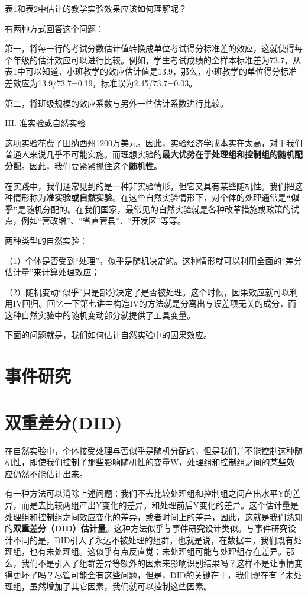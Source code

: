 \documentclass[cn,10pt,math=newtx,citestyle=gb7714-2015,bibstyle=gb7714-2015]{elegantbook}
\begin{document}
	表1和表2中估计的教学实验效果应该如何理解呢？
	
	有两种方式回答这个问题：
	
	第一，将每一行的考试分数估计值转换成单位考试得分标准差的效应，这就使得每个年级的估计效应可以进行比较。例如，学生考试成绩的全样本标准差为73.7，从表1中可以知道，小班教学的效应估计值是13.9，那么，小班教学的单位得分标准差效应为13.9/73.7=0.19，标准误为2.45/73.7=0.03。
	
	第二，将班级规模的效应系数与另外一些估计系数进行比较。
	
	III. 准实验或自然实验
	
	这项实验花费了田纳西州1200万美元。因此，实验经济学成本实在太高，对于我们普通人来说几乎不可能实施。而理想实验的\textbf{最大优势在于处理组和控制组的随机配分配}。因此，我们要紧紧抓住这个\textbf{随机性}。
	
	在实践中，我们通常见到的是一种非实验情形，但它又具有某些随机性。我们把这种情形称为\textbf{准实验或自然实验}。在这些自然实验情形下，对个体的处理通常是\textbf{“似乎”}是随机分配的。在我们国家，最常见的自然实验就是各种改革措施或政策的试点，例如“营改增”、“省直管县”、“开发区”等等。
	
	两种类型的自然实验：
	
	（1）个体是否受到“处理”，似乎是随机决定的。这种情形就可以利用全面的“差分估计量”来计算处理效应；
	
	（2）随机变动“似乎”只是部分决定了是否被处理。这个时候，因果效应就可以利用IV回归。回忆一下第七讲中构造IV的方法就是分离出与误差项无关的成分，而这种自然实验中的随机变动部分就提供了工具变量。
	
	下面的问题就是，我们如何估计自然实验中的因果效应。
	
	\section{事件研究}
	
	
	
	
	\section{双重差分(DID)}
	
	在自然实验中，个体接受处理与否似乎是随机分配的，但是我们并不能控制这种随机性，即使我们控制了那些影响随机性的变量W，处理组和控制组之间的某些效应仍然不能估计出来。
	
	有一种方法可以消除上述问题：我们不去比较处理组和控制组之间产出水平Y的差异，而是去比较两组产出Y变化的差异，和处理前后Y变化的差异。这个估计量是处理组和控制组之间效应变化的差异，或者时间上的差异，因此，这就是我们熟知的\textbf{双重差分（DID）估计量}。这种方法似乎与事件研究设计类似。与事件研究设计不同的是，DID引入了永远不被处理的组群，也就是说，在数据中，我们既有处理组，也有未处理组。这似乎有点反直觉：未处理组可能与处理组存在差异。那么，我们不是引入了组群差异等额外的因素来影响识别结果吗？这样不是让事情变得更坏了吗？尽管可能会有这些问题，但是，DID的关键在于，我们现在有了未处理组，虽然增加了其它因素，我们就可以控制这些因素。
	
\end{document}
